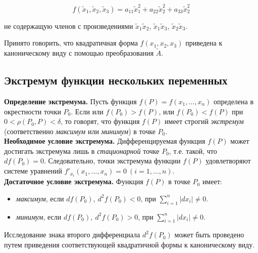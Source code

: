 \[
f \left( \tilde{x}_{1}, \tilde{x}_{2}, \tilde{x}_{3} \right) = a_{11} \tilde{x}^{2}_{1} + a_{22} \tilde{x}^{2}_{2} + a_{33} \tilde{x}^{2}_{2}
\]

не содержащую членов с произведениями $\tilde{x}_{1} \tilde{x}_{2}$, $\tilde{x}_{1} \tilde{x}_{3}$, $\tilde{x}_{2} \tilde{x}_{3}$.

Принято говорить, что квадратичная форма $f \left( x_{1}, x_{2}, x_{3} \right)$ приведена к каноническому виду с помощью преобразования $\tilde{A}$.

\subsection{Экстремум функции нескольких переменных}

\textbf{Определение экстремума.} Пусть функция $f \left( P \right) = f \left( x_{1}, \ldots, x_{n} \right)$ определена в окрестности точки $P_{0}$. Если или $f \left( P_{0} \right) > f \left( P \right)$, или $f \left( P_{0} \right) < f \left( P \right)$ при $0 < \rho \left( P_{0}, P \right) < \delta$, то говорят, что функция $f \left( P \right)$ имеет строгий \textit{экстремум} (соответственно \textit{максимум} или \textit{минимум}) в точке $P_{0}$.\\

\textbf{Необходимое условие экстремума.} Дифференцируемая функция $f \left( P \right)$ может достигать экстремума лишь в \textit{стационарной} точке $P_{0}$, т.е. такой, что $d f \left( P_{0} \right) = 0$. Следовательно, точки экстремума функции $f \left( P \right)$ удовлетворяют системе уравнений $f'_{x_{i}} \left( x_{1}, \ldots, x_{n} \right) = 0 \: (i = 1, \ldots, n)$.\\

\textbf{Достаточное условие экстремума.} Функция $f \left( P \right)$ в точке $P_{0}$ имеет:

\begin{itemize}
	\item \textit{максимум}, если $d f \left( P_{0} \right), \: d^{2} f \left( P_{0} \right) < 0$, при $\sum^{n}_{i = 1} \left| d x_{i} \right| \neq 0$.
	\item \textit{минимум}, если $d f \left( P_{0} \right), \: d^{2} f \left( P_{0} \right) > 0$, при $\sum^{n}_{i = 1} \left| d x_{i} \right| \neq 0$.
\end{itemize}

Исследование знака второго дифференциала $d^{2} f \left( P_{0} \right)$ может быть проведено путем приведения соответствующей квадратичной формы к каноническому виду.\\


